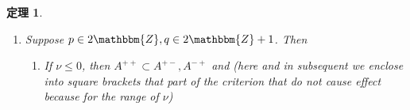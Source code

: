 \documentclass[12pt]{msjproc} %
\newcommand{\tmop}[1]{\ensuremath{\operatorname{#1}}}
\newtheorem{theorem}{定理}
\begin{document}
\begin{versiona}
\begin{theorem}
\begin{enumerate}
\begin{enumerate}
      \
      
      \item If $\nu > p + q - 3$, then $A^{+ -} \subset A^{- -}$ and
      
      \begin{center}
        \begin{center}
          \begin{center}
            \begin{center}
              \begin{tabular}{|c|c|c|}
                \hline
                & $\nu \in 2\mathbbm{Z}$ & $\nu \in 2\mathbbm{Z}+ 1$\\
                \hline
                $(/ / \cup \backslash\backslash)^c$ & $\tmop{full}$ & $A^{+
                -}$\\
                \hline
                $\backslash\backslash - / /$ & $A^{- +}$ & $A^{+ -}$\\
                \hline
                $/ / -\backslash\backslash$ & $\tmop{full}$ & $\varnothing$\\
                \hline
              \end{tabular}
            \end{center}
          \end{center}
        \end{center}
      \end{center}
      
      \ 
    \end{enumerate}
    \item Suppose $p \in 2\mathbbm{Z}, q \in 2\mathbbm{Z}+ 1$. Then
    \begin{enumerate}
      \item If $\nu \leqslant 0$, then $A^{+ +} \subset A^{+ -}, A^{- +}$ and
      (here and in subsequent we enclose into square brackets that part of the
      criterion that do not cause effect because for the range of $\nu$)
      

\end{enumerate}
\end{enumerate}
\end{theorem}
\end{versiona}
\end{document}
